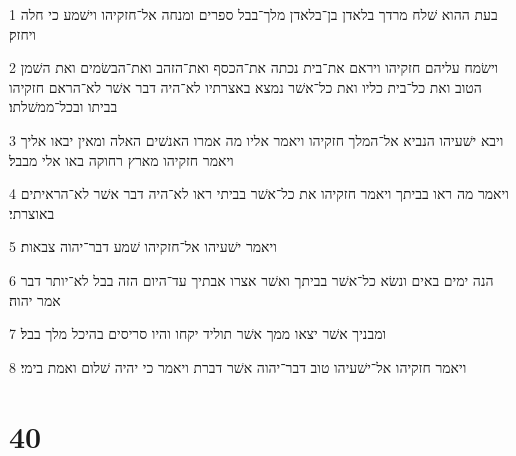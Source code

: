 \par 1 בעת ההוא שׁלח מרדך בלאדן בן־בלאדן מלך־בבל ספרים ומנחה אל־חזקיהו וישׁמע כי חלה ויחזק׃
\par 2 וישׂמח עליהם חזקיהו ויראם את־בית נכתה את־הכסף ואת־הזהב ואת־הבשׂמים ואת השׁמן הטוב ואת כל־בית כליו ואת כל־אשׁר נמצא באצרתיו לא־היה דבר אשׁר לא־הראם חזקיהו בביתו ובכל־ממשׁלתו׃
\par 3 ויבא ישׁעיהו הנביא אל־המלך חזקיהו ויאמר אליו מה אמרו האנשׁים האלה ומאין יבאו אליך ויאמר חזקיהו מארץ רחוקה באו אלי מבבל׃
\par 4 ויאמר מה ראו בביתך ויאמר חזקיהו את כל־אשׁר בביתי ראו לא־היה דבר אשׁר לא־הראיתים באוצרתי׃
\par 5 ויאמר ישׁעיהו אל־חזקיהו שׁמע דבר־יהוה צבאות׃
\par 6 הנה ימים באים ונשׂא כל־אשׁר בביתך ואשׁר אצרו אבתיך עד־היום הזה בבל לא־יותר דבר אמר יהוה׃
\par 7 ומבניך אשׁר יצאו ממך אשׁר תוליד יקחו והיו סריסים בהיכל מלך בבל׃
\par 8 ויאמר חזקיהו אל־ישׁעיהו טוב דבר־יהוה אשׁר דברת ויאמר כי יהיה שׁלום ואמת בימי׃

\chapter{40}

